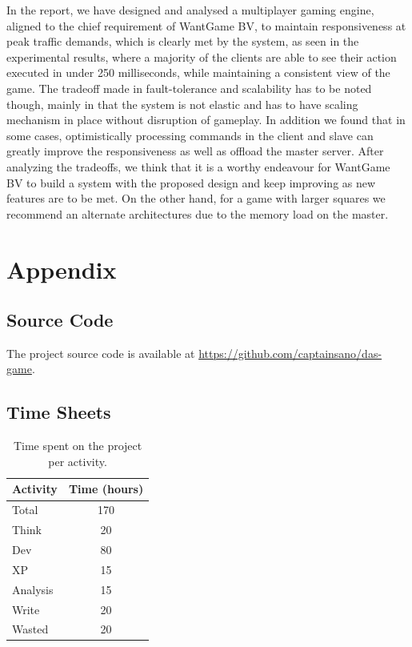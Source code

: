 \documentclass[a4paper]{IEEEtran}
\begin{document}
  In the report, we have designed and analysed a multiplayer gaming engine, aligned to the chief requirement of WantGame BV, to maintain responsiveness at peak traffic demands, which is clearly met by the system, as seen in the experimental results, where a majority of the clients are able to see their action executed in under 250 milliseconds, while maintaining a consistent view of the game. The tradeoff made in fault-tolerance and scalability has to be noted though, mainly in that the system is not elastic and has to have scaling mechanism in place without disruption of gameplay. In addition we found that in some cases, optimistically processing commands in the client and slave can greatly improve the responsiveness as well as offload the master server. After analyzing the tradeoffs, we think that it is a worthy endeavour for WantGame BV to build a system with the proposed design and keep improving as new features are to be met. On the other hand, for a game with larger squares we recommend an alternate architectures due to the memory load on the master.
  
  
  

  \section*{Appendix}

  \subsection{Source Code}

  The project source code is available at \url{https://github.com/captainsano/das-game}.
  
  \subsection{Time Sheets}
  
  \begin{table}[htbp]
    \centering
    \caption{Time spent on the project per activity.}
    \begin{tabular}{| l | c |}
      \hline
      Activity & Time (hours) \\
      \hline
      Total & 170 \\
      Think & 20 \\
      Dev & 80 \\
      XP & 15 \\
      Analysis & 15 \\
      Write & 20 \\
      Wasted & 20 \\
      \hline
    \end{tabular}
  \end{table}
\end{document}
